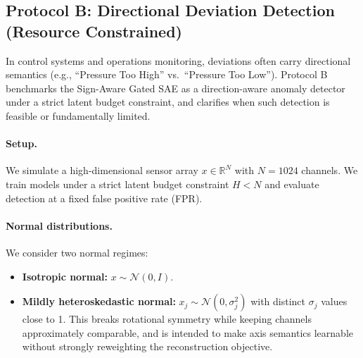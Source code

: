\documentclass{article}
\begin{document}
\subsection{Protocol B: Directional Deviation Detection (Resource Constrained)}
\label{sec:protocol_b}

In control systems and operations monitoring, deviations often carry directional semantics (e.g., ``Pressure Too High'' vs.\ ``Pressure Too Low''). Protocol B benchmarks the Sign-Aware Gated SAE as a direction-aware anomaly detector under a strict latent budget constraint, and clarifies when such detection is feasible or fundamentally limited.

\paragraph{Setup.}
We simulate a high-dimensional sensor array $x \in \mathbb{R}^N$ with $N=1024$ channels. We train models under a strict latent budget constraint $H < N$ and evaluate detection at a fixed false positive rate (FPR).

\paragraph{Normal distributions.}
We consider two normal regimes:
\begin{itemize}
    \item \textbf{Isotropic normal:} $x \sim \mathcal{N}(0, I)$.
    \item \textbf{Mildly heteroskedastic normal:} $x_j \sim \mathcal{N}(0, \sigma_j^2)$ with distinct $\sigma_j$ values close to 1. This breaks rotational symmetry while keeping channels approximately comparable, and is intended to make axis semantics learnable without strongly reweighting the reconstruction objective.
\end{itemize}
\end{document}
